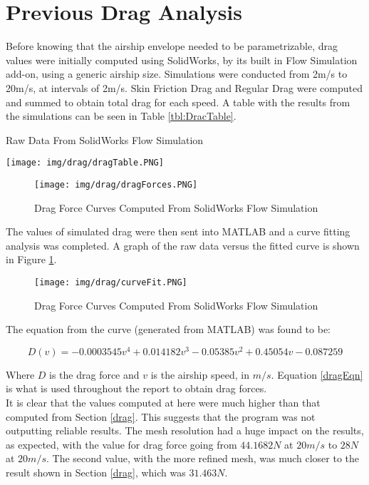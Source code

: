 \documentclass[../main.tex]{subfiles}
\begin{document}
\section{Previous Drag Analysis}

Before knowing that the airship envelope needed to be parametrizable, drag values were initially computed using SolidWorks, by its built in Flow Simulation add-on, using a generic airship size. Simulations were conducted from 2m/s to 20m/s, at intervals of 2m/s. Skin Friction Drag and Regular Drag were computed and summed to obtain total drag for each speed. A table with the results from the simulations can be seen in Table \ref{tbl:DracTable}.

\begin{table}[H]
	\centering
	\caption{Raw Data From SolidWorks Flow Simulation}
	\texttt{[image: img/drag/dragTable.PNG]}
	\label{tbl:DracTable}
\end{table}

\begin{figure}[H]
	\centering
	\texttt{[image: img/drag/dragForces.PNG]}
	\caption{Drag Force Curves Computed From SolidWorks Flow Simulation}
	\label{fig:dragForces}
\end{figure}

The values of simulated drag were then sent into MATLAB and a curve fitting analysis was completed. A graph of the raw data versus the fitted curve is shown in Figure \ref{fig:dragForces}.

\begin{figure}[H]
	\centering
	\texttt{[image: img/drag/curveFit.PNG]}
	\caption{Drag Force Curves Computed From SolidWorks Flow Simulation}
	\label{fig:curveFit}
\end{figure}

The equation from the curve (generated from MATLAB) was found to be:

\begin{equation} \label{dragEqn}
	D(v) = -0.0003545v^4 + 0.014182v^3 -0.05385v^2 + 0.45054v -0.087259
\end{equation}

Where $ D $ is the drag force and $ v $ is the airship speed, in $m/s$. Equation \ref{dragEqn} is what is used throughout the report to obtain drag forces.\\

It is clear that the values computed at here were much higher than that computed from Section \ref{drag}. This suggests that the program was not outputting reliable results. The mesh resolution had a huge impact on the results, as expected, with the value for drag force going from $ 44.1682N $ at $ 20m/s $ to $ 28N $ at $ 20m/s $. The second value, with the more refined mesh, was much closer to the result shown in Section \ref{drag}, which was $31.463N$.
\end{document}
